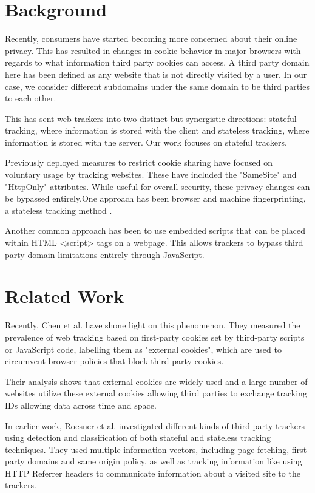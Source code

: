 \documentclass[sigplan,screen]{acmart}
\begin{document}
\section{Background}

Recently, consumers have started becoming more concerned about their online privacy. This has resulted in changes in cookie behavior in major browsers with regards to what information third party cookies can access\cite{firefox}. A third party domain here has been defined as any website that is not directly visited by a user. In our case, we consider different subdomains under the same domain to be third parties to each other.

This has sent web trackers into two distinct but synergistic directions: stateful tracking, where information is stored with the client  and stateless tracking, where information is stored with the server\cite{redhat}. Our work focuses on stateful trackers.

Previously deployed measures to restrict cookie sharing have focused on voluntary usage by tracking websites. These have included the "SameSite" and "HttpOnly"\cite{mdn} attributes. While useful for overall security, these privacy changes can be bypassed entirely.One approach has been browser and machine fingerprinting, a stateless tracking method\cite{englehardt2016census} . 

Another common approach has been to use embedded scripts that can be placed within HTML <script> tags on a webpage\cite{chen2021cookie}. This allows trackers to bypass third party domain limitations entirely through JavaScript.


\section{Related Work}

Recently, Chen et al. have shone light on this phenomenon\cite{chen2021cookie}. They measured the prevalence of web tracking based on first-party cookies set by third-party scripts or JavaScript code, labelling them as "external cookies", which are used to circumvent browser policies that block third-party cookies. 

Their analysis  shows that external cookies are widely used and a large number of websites utilize these external cookies allowing third parties to exchange tracking IDs allowing data across time and space. 

In earlier work, Roesner et al. investigated different kinds of third-party trackers using detection and classification of both stateful and stateless tracking techniques\cite{roesner2012detecting}. They used multiple information vectors, including page fetching, first-party domains and same origin policy, as well as tracking information like using HTTP Referrer headers to communicate information about a visited site to the trackers. 
\end{document}
